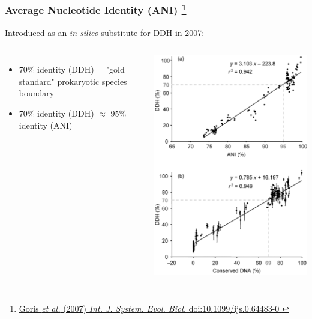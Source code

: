 
%
\begin{frame}
  \frametitle{Average Nucleotide Identity (ANI)
  \footnote{\tiny{\href{http://dx.doi.org/10.1099/ijs.0.64483-0
}{Goris \textit{et al.} (2007) \textit{Int. J. System. Evol. Biol.} doi:10.1099/ijs.0.64483-0
}}}
  }
  Introduced as an \textit{in silico} substitute for DDH in 2007:
  \begin{columns}[T] 
      \begin{itemize}
        \item \textcolor{hutton_green}{70\% identity (DDH) = "gold standard" prokaryotic species boundary}
        \item \textcolor{hutton_blue}{70\% identity (DDH) $\approx$ 95\% identity (ANI)}
      \end{itemize}
      \includegraphics[width=\textwidth]{images/ani_ddh_equiv}
  \end{columns}    
\end{frame}

